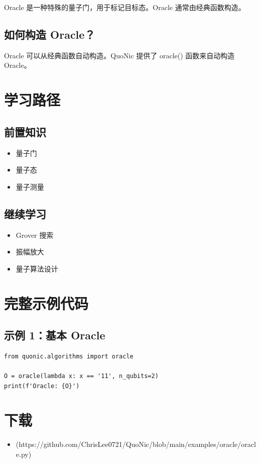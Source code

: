 \documentclass[12pt,a4paper]{article}
\begin{document}
Oracle 是一种特殊的量子门，用于标记目标态。Oracle 通常由经典函数构造。

\subsection{如何构造 Oracle？}

Oracle 可以从经典函数自动构造。QuoNic 提供了 oracle() 函数来自动构造 Oracle。

\section{学习路径}

\subsection{前置知识}
\begin{itemize}
  \item 量子门
  \item 量子态
  \item 量子测量
\end{itemize}

\subsection{继续学习}
\begin{itemize}
  \item Grover 搜索
  \item 振幅放大
  \item 量子算法设计
\end{itemize}

\section{完整示例代码}

\subsection{示例 1：基本 Oracle}

\begin{verbatim}
from quonic.algorithms import oracle

O = oracle(lambda x: x == '11', n_qubits=2)
print(f'Oracle: {O}')
\end{verbatim}

\section{下载}

\begin{itemize}
  \item [oracle.py](https://github.com/ChrisLee0721/QuoNic/blob/main/examples/oracle/oracle.py)
\end{itemize}
\end{document}
